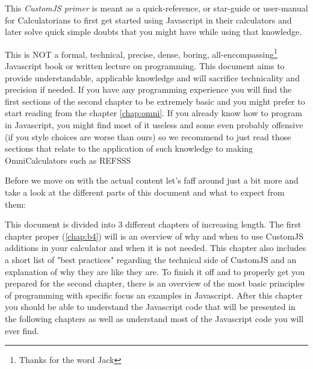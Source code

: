 \documentclass[11pt,a4paper,oldfontcommands]{memoir}
\begin{document}
This \textit{CustomJS primer} is meant as a quick-reference, or star-guide or user-manual for Calculatorians to first get started using Javascript in their calculators and later solve quick simple doubts that you might have while using that knowledge.

This is NOT a formal, technical, precise, dense, boring, all-encompassing\footnote{Thanks for the word Jack} Javascript book or written lecture on programming. This document aims to provide understandable, applicable knowledge and will sacrifice technicality and precision if needed. 
If you have any programming experience you will find the first sections of the second chapter to be extremely basic and you might prefer to start reading from the chapter \ref{chap:omni}. If you already know how to program in Javascript, you might find most of it useless and some even probably offensive (if you style choices are worse than ours) so we recommend to just read those sections that relate to the application of such knowledge to making OmniCalculators such as REFSSS

Before we move on with the actual content let's faff around just a bit more and take a look at the different parts of this document and what to expect from them:

\iffalse
\begin{itemize}
    \item Chapter 1.- \textbf{Before you start} 
        \subitem Section 1.1 - A brief description of that is CustomJS what it does and how and when to use it
        \subitem Section 1.2 - Quick overview of the functions specific to omni that don't exist in regular JS
        \subitem Section 1.3 - A \textit{Gepe-complete}\footnote{\textit{Gepe-complete} Refers to an item that's been deemed complete by Alvaro Diez} start guide to get you started in programming from scratch, plus some additions relevant to CustomJS at Omni
        \subitem Section 1.4 - A collection of \textit{rules} that we have in place at Omni and their reasons to exist
    \item Chapter 2.- \textbf{Okay so you are already coding...}
        \subitem Section 2.1 - Basic and advance use cases in Custom JS with strong focus on Omni functions
        \subitem Section 2.2 - How to prevent errors and what to do when they happen
        \subitem Section 2.3 - Style guide as agreed by most of Omni Calculatorians. Follow or be bullied.
\end{itemize}
\fi

This document is divided into 3 different chapters of increasing length. The first chapter proper (\ref{chap:b4}) will is an overview of why and when to use CustomJS additions in your calculator and when it is not needed. This chapter also includes a short list of "best practices" regarding the technical side of CustomJS and an explanation of why they are like they are. To finish it off and to properly get you prepared for the second chapter, there is an overview of the most basic principles of programming with specific focus an examples in Javascript. After this chapter you should be able to understand the Javascript code that will be presented in the following chapters as well as understand most of the Javascript code you will ever find.
\end{document}
